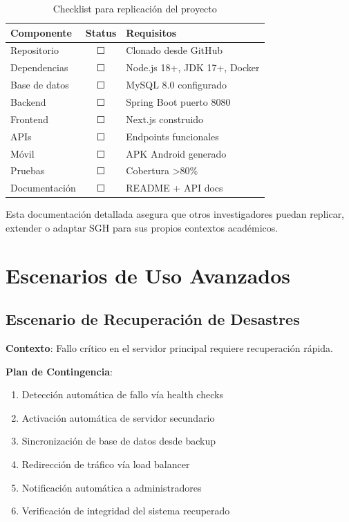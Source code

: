 \begin{table}[h]
\centering
\caption{Checklist para replicación del proyecto}
\label{tab:checklist}
\begin{tabular}{|l|c|l|}
\hline
\textbf{Componente} & \textbf{Status} & \textbf{Requisitos} \\
\hline
Repositorio & ☐ & Clonado desde GitHub \\
\hline
Dependencias & ☐ & Node.js 18+, JDK 17+, Docker \\
\hline
Base de datos & ☐ & MySQL 8.0 configurado \\
\hline
Backend & ☐ & Spring Boot puerto 8080 \\
\hline
Frontend & ☐ & Next.js construido \\
\hline
APIs & ☐ & Endpoints funcionales \\
\hline
Móvil & ☐ & APK Android generado \\
\hline
Pruebas & ☐ & Cobertura >80\% \\
\hline
Documentación & ☐ & README + API docs \\
\hline
\end{tabular}
\end{table}

Esta documentación detallada asegura que otros investigadores puedan replicar, extender o adaptar SGH para sus propios contextos académicos.

\section{Escenarios de Uso Avanzados}

\subsection{Escenario de Recuperación de Desastres}

\textbf{Contexto}: Fallo crítico en el servidor principal requiere recuperación rápida.

\textbf{Plan de Contingencia}:
\begin{enumerate}
\item Detección automática de fallo vía health checks
\item Activación automática de servidor secundario
\item Sincronización de base de datos desde backup
\item Redirección de tráfico vía load balancer
\item Notificación automática a administradores
\item Verificación de integridad del sistema recuperado
\end{enumerate}

